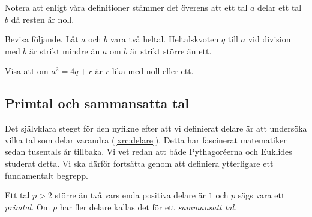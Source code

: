 Notera att enligt våra definitioner stämmer det överens att ett tal \(a\) delar 
ett tal \(b\) då resten är noll.

\begin{exercise}\label{xrc:KvotenMindre}
  Bevisa följande.
  Låt \(a\) och \(b\) vara två heltal.
  Heltalskvoten \(q\) till \(a\) vid division med \(b\) är strikt mindre än 
  \(a\) om \(b\) är strikt större än ett.
\end{exercise}
\begin{exercise}
  Visa att om \(a^2 = 4q + r\) är \(r\) lika med noll eller ett.
\end{exercise}

\subsection{Primtal och sammansatta tal}
Det självklara steget för den nyfikne efter att vi definierat delare är att 
undersöka vilka tal som delar varandra (\cref{xrc:delare}).
Detta har fascinerat matematiker sedan tusentals år tillbaka.
Vi vet redan att både Pythagoréerna och Euklides studerat detta.
Vi ska därför fortsätta genom att definiera ytterligare ett fundamentalt 
begrepp.
\begin{definition}
  Ett tal \(p > 2\) större än två vars enda positiva delare är \(1\) och \(p\) 
  sägs vara ett \emph{primtal}.
  Om \(p\) har fler delare kallas det för ett \emph{sammansatt tal}.
\end{definition}

